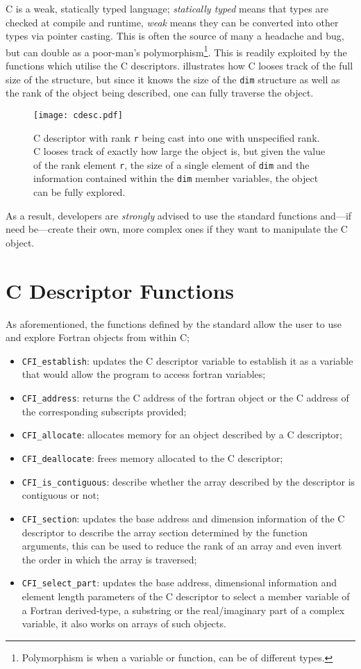 C is a weak, statically typed language; \emph{statically typed} means that types are checked at compile and runtime, \emph{weak} means they can be converted into other types via pointer casting. This is often the source of many a headache and bug, but can double as a poor-man's polymorphism\footnote{Polymorphism is when a variable or function, can be of different types.}. This is readily exploited by the functions which utilise the C descriptors.  illustrates how C looses track of the full size of the structure, but since it knows the size of the \texttt{dim} structure as well as the rank of the object being described, one can fully traverse the object.
\begin{figure}
    \centering
    \texttt{[image: cdesc.pdf]}
    \caption{C descriptor with rank \texttt{r} being cast into one with unspecified rank. C looses track of exactly how large the object is, but given the value of the rank element \texttt{r}, the size of a single element of \texttt{dim} and the information contained within the \texttt{dim} member variables, the object can be fully explored.}
    \label{f:cast}
\end{figure}
As a result, developers are \emph{strongly} advised to use the standard functions and---if need be---create their own, more complex ones if they want to manipulate the C object.

\section{C Descriptor Functions}

As aforementioned, the functions defined by the standard \cite{fortran} allow the user to use and explore Fortran objects from within C;
\begin{itemize}
    \item \texttt{CFI\_establish}: updates the C descriptor variable to establish it as a variable that would allow the program to access fortran variables;
    \item \texttt{CFI\_address}: returns the C address of the fortran object or the C address of the corresponding subscripts provided;
    \item \texttt{CFI\_allocate}: allocates memory for an object described by a C descriptor;
    \item \texttt{CFI\_deallocate}: frees memory allocated to the C descriptor;
    \item \texttt{CFI\_is\_contiguous}: describe whether the array described by the descriptor is contiguous or not;
    \item \texttt{CFI\_section}: updates the base address and dimension information of the C descriptor to describe the array section determined by the function arguments, this can be used to reduce the rank of an array and even invert the order in which the array is traversed;
    \item \texttt{CFI\_select\_part}: updates the base address, dimensional information and element length parameters of the C descriptor to select a member variable of a Fortran derived-type, a substring or the real/imaginary part of a complex variable, it also works on arrays of such objects.
\end{itemize}

